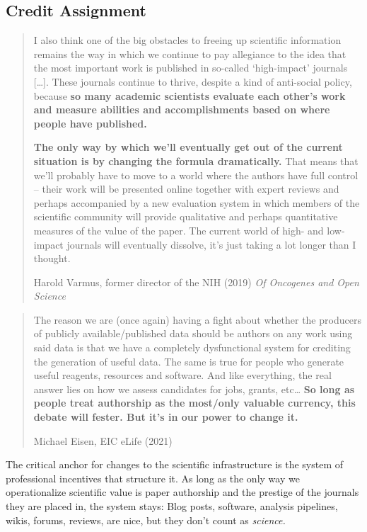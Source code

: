 \hypertarget{credit-assignment}{%
\subsection{Credit Assignment}\label{credit-assignment}}

\begin{quote}
I also think one of the big obstacles to freeing up scientific
information remains the way in which we continue to pay allegiance to
the idea that the most important work is published in so-called
`high-impact' journals {[}\ldots{]}. These journals continue to thrive,
despite a kind of anti-social policy, because \textbf{so many academic
scientists evaluate each other's work and measure abilities and
accomplishments based on where people have published.}

\textbf{The only way by which we'll eventually get out of the current
situation is by changing the formula dramatically.} That means that
we'll probably have to move to a world where the authors have full
control -- their work will be presented online together with expert
reviews and perhaps accompanied by a new evaluation system in which
members of the scientific community will provide qualitative and perhaps
quantitative measures of the value of the paper. The current world of
high- and low-impact journals will eventually dissolve, it's just taking
a lot longer than I thought.

Harold Varmus, former director of the NIH (2019) \emph{Of Oncogenes and
Open Science} \citep{varmusOncogenesOpenScience2019} 
\end{quote}

\begin{quote}
The reason we are (once again) having a fight about whether the
producers of publicly available/published data should be authors on any
work using said data is that we have a completely dysfunctional system
for crediting the generation of useful data. \citep{eisenReasonWeAre2021}  The same is true for people who generate
useful reagents, resources and software. \citep{eisenSameTruePeople2021}  And like everything, the real answer lies
on how we assess candidates for jobs, grants, etc\ldots{} \textbf{So
long as people treat authorship as the most/only valuable currency, this
debate will fester. But it's in our power to change it.} \citep{eisenEverythingRealAnswer2021} 

Michael Eisen, EIC eLife (2021)
\end{quote}

The critical anchor for changes to the scientific infrastructure is the
system of professional incentives that structure it. As long as the only
way we operationalize scientific value is paper authorship and the
prestige of the journals they are placed in, the system stays: Blog
posts, software, analysis pipelines, wikis, forums, reviews, are nice,
but they don't count as \emph{science.}

